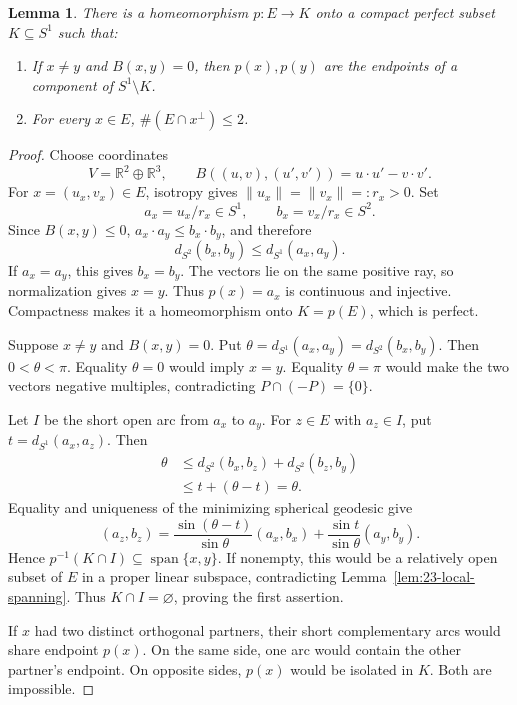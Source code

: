 \documentclass[11pt,reqno]{amsart}
\newcommand{\R}{\mathbb{R}}
\theoremstyle{plain}
\newtheorem{lemma}[theorem]{Lemma}
\theoremstyle{definition}
\theoremstyle{remark}
\numberwithin{equation}{section}
\begin{document}
\begin{lemma}\label{lem:23-circle}
There is a homeomorphism $p:E\to K$ onto a compact perfect subset $K\subseteq S^1$ such that:
\begin{enumerate}
\item If $x\neq y$ and $B(x,y)=0$, then $p(x),p(y)$ are the endpoints of a component of $S^1\setminus K$.
\item For every $x\in E$, $\#(E\cap x^\perp)\leq2$.
\end{enumerate}
\end{lemma}
\begin{proof}
Choose coordinates
\[
V=\R^2\oplus\R^3,\qquad B((u,v),(u',v'))=u\cdot u'-v\cdot v'.
\]
For $x=(u_x,v_x)\in E$, isotropy gives $\|u_x\|=\|v_x\|=:r_x>0$. Set
\[
a_x=u_x/r_x\in S^1,\qquad b_x=v_x/r_x\in S^2.
\]
Since $B(x,y)\leq0$, $a_x\cdot a_y\leq b_x\cdot b_y$, and therefore
\begin{equation}\label{eq:23-circle-distance}
d_{S^2}(b_x,b_y)\leq d_{S^1}(a_x,a_y).
\end{equation}
If $a_x=a_y$, this gives $b_x=b_y$. The vectors lie on the same positive ray, so normalization gives $x=y$. Thus $p(x)=a_x$ is continuous and injective. Compactness makes it a homeomorphism onto $K=p(E)$, which is perfect.

Suppose $x\neq y$ and $B(x,y)=0$. Put $\theta=d_{S^1}(a_x,a_y)=d_{S^2}(b_x,b_y)$. Then $0<\theta<\pi$. Equality $\theta=0$ would imply $x=y$. Equality $\theta=\pi$ would make the two vectors negative multiples, contradicting $P\cap(-P)=\{0\}$.

Let $I$ be the short open arc from $a_x$ to $a_y$. For $z\in E$ with $a_z\in I$, put $t=d_{S^1}(a_x,a_z)$. Then
\[
\begin{aligned}
\theta&\leq d_{S^2}(b_x,b_z)+d_{S^2}(b_z,b_y)\\
&\leq t+(\theta-t)=\theta.
\end{aligned}
\]
Equality and uniqueness of the minimizing spherical geodesic give
\[
(a_z,b_z)=\frac{\sin(\theta-t)}{\sin\theta}(a_x,b_x)
+\frac{\sin t}{\sin\theta}(a_y,b_y).
\]
Hence $p^{-1}(K\cap I)\subseteq\operatorname{span}\{x,y\}$. If nonempty, this would be a relatively open subset of $E$ in a proper linear subspace, contradicting Lemma~\ref{lem:23-local-spanning}. Thus $K\cap I=\varnothing$, proving the first assertion.

If $x$ had two distinct orthogonal partners, their short complementary arcs would share endpoint $p(x)$. On the same side, one arc would contain the other partner's endpoint. On opposite sides, $p(x)$ would be isolated in $K$. Both are impossible.
\end{proof}
\end{document}
